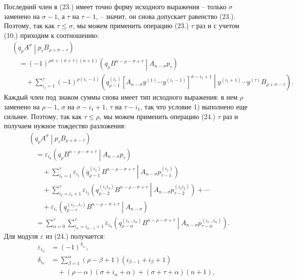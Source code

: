\documentclass[11pt]{article}
\newcommand{\pair}[2]{\left(#1\middle|#2\right)}
\newcommand{\eps}{\varepsilon}
\begin{document}
Последний член в (23.) имеет точно форму исходного выражения -- только $\sigma$ заменено на $\sigma-1$, а $\tau$ на $\tau-1$, -- значит, он снова допускает равенство (23.). Поэтому, так как $\tau\le\sigma$, мы можем применить операцию (23.) $\tau$ раз и с учетом (10.) приходим к соотношению:
\begin{equation}
\begin{aligned}
&\pair{q_\rho A^\sigma}{p_\tau B_{\rho+\sigma-\tau}}\\
&\quad=(-1)^{\rho\sigma+(\sigma+\tau)(n+1)}
\pair{q_\rho B^{n-\rho-\sigma+\tau}}{A_{n-\sigma}p_\tau}\\
&\qquad+\sum_{i_1=1}^{\tau}(-1)^{\rho(i_1-1)}
\pair{q_{\rho-1}^{(i_1)}
[A_{n-\sigma}y^{(1)}\cdots y^{(i_1-1)}]^{\sigma-i_1+1}}
{y^{(i_1+1)}\cdots y^{(\tau)}B_{\rho+\sigma-\tau}}.
\end{aligned}
\tag{24}
\end{equation}
Каждый член под знаком суммы снова имеет тип исходного выражения: в нем $\rho$ заменено на $\rho-1$, $\sigma$ на $\sigma-i_1+1$, $\tau$ на $\tau-i_1$, так что условие 1) выполнено еще сильнее. Поэтому, так как $\tau\le\rho$, мы можем применить операцию (24.) $\tau$ раз и получаем нужное тождество разложения:
\begin{equation}
\begin{aligned}
&\pair{q_\rho A^\sigma}{p_\tau B_{\rho+\sigma-\tau}}\\
&\quad=\eps_{i_0}\pair{q_\rho B^{n-\rho-\sigma+\tau}}
{A_{n-\sigma}p_\tau}\\
&\qquad+\sum_{i_1=1}^{\tau}\eps_{i_1}
\pair{q_{\rho-1}^{(i_1)}B^{n-\rho-\sigma+\tau}}
{A_{n-\sigma}p_{\tau-1}^{(i_1)}}\\
&\qquad+\sum_{i_2=i_1+1}^{\tau}\eps_{i_2}
\pair{q_{\rho-2}^{(i_1i_2)}B^{n-\rho-\sigma+\tau}}
{A_{n-\sigma}p_{\tau-2}^{(i_1i_2)}}+\cdots\\
&\qquad+\eps_{i_\tau}
\pair{q_{\rho-\tau}^{(i_1\ldots i_\tau)}B^{n-\rho-\sigma+\tau}}
{A_{n-\sigma}}\\
&\quad=\sum_{\alpha=0}^{\tau}
\sum_{i_\alpha=i_{\alpha-1}+1}^{\tau}\eps_{i_\alpha}
\pair{q_{\rho-\alpha}^{(i_1\ldots i_\alpha)}B^{n-\rho-\sigma+\tau}}
{A_{n-\sigma}p_{\tau-\alpha}^{(i_1\ldots i_\alpha)}}.
\end{aligned}
\tag{25}
\end{equation}
Для модуля $\eps$ из (24.) получается:
\begin{equation}
\begin{aligned}
\eps_{i_\alpha}&=(-1)^{\delta_{i_\alpha}},\\
\delta_{i_\alpha}
&=\sum_{\beta=1}^{\alpha}(\rho-\beta+1)(i_{\beta-1}+i_\beta+1)\\
&\quad+(\rho-\alpha)(\sigma+i_\alpha+\alpha)
+(\sigma+\tau+\alpha)(n+1),
\end{aligned}
\tag{26}
\end{equation}
\end{document}
